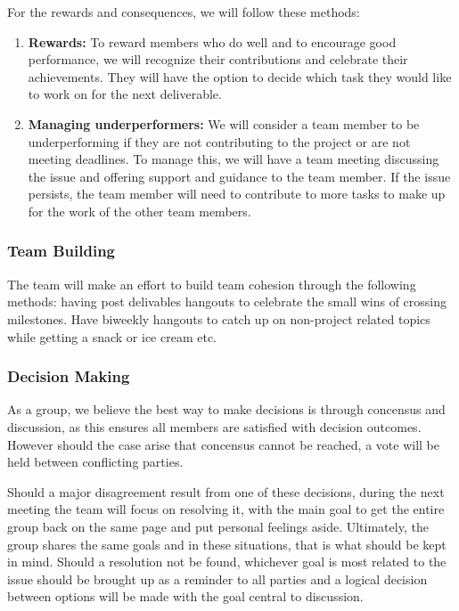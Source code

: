 \documentclass{article}
\begin{document}
For the rewards and consequences, we will follow these methods:

\begin{enumerate}
  \item \textbf{Rewards:} To reward members who do well and to encourage good performance, we will recognize their contributions and celebrate their achievements. They will have the option to decide which task they would like to work on for the next deliverable.
  \item \textbf{Managing underperformers:} We will consider a team member to be underperforming if they are not contributing to the project or are not meeting deadlines. To manage this, we will have a team meeting discussing the issue and offering support and guidance to the team member. If the issue persists, the team member will need to contribute to more tasks to make up for the work of the other team members.
\end{enumerate}


\subsubsection*{Team Building}

The team will make an effort to build team cohesion through the following methods: having post delivables hangouts to celebrate the small wins of crossing milestones. Have biweekly hangouts to catch up on non-project related topics while getting a snack or ice cream etc.

\subsubsection*{Decision Making} 

As a group, we believe the best way to make decisions is through concensus and discussion, 
as this ensures all members are satisfied with decision outcomes. However should the case 
arise that concensus cannot be reached, a vote will be held between conflicting parties.

Should a major disagreement result from one of these decisions, during the next meeting 
the team will focus on resolving it, with the main goal to get the entire group back on 
the same page and put personal feelings aside. Ultimately, the group shares the same goals 
and in these situations, that is what should be kept in mind. Should a resolution not be found, 
whichever goal is most related to the issue should be brought up as a reminder to all 
parties and a logical decision between options will be made with the goal central to discussion.
\end{document}
